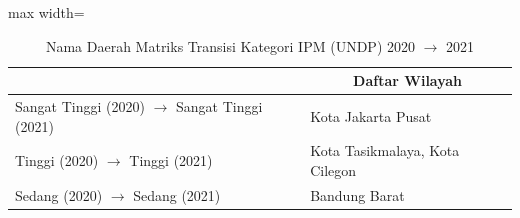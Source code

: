 \begin{table}[H]
\centering
\caption{Nama Daerah Matriks Transisi Kategori IPM (UNDP) 2020 \(\rightarrow\) 2021} \label{tab:sample2ipmname2020x2021}
\begin{adjustbox}{max width=\textwidth}
\begin{tabular}{|>{\centering\arraybackslash}p{4cm}|p{10cm}|}
\hline
\multicolumn{1}{|c|}{\textbf{Kategori}} & \multicolumn{1}{c|}{\textbf{Daftar Wilayah}} \\
\hline
Sangat Tinggi (2020) \(\rightarrow\) Sangat Tinggi (2021) & Kota Jakarta Pusat \\
\hline
Tinggi (2020) \(\rightarrow\) Tinggi (2021) & Kota Tasikmalaya, Kota Cilegon \\
\hline
Sedang (2020) \(\rightarrow\) Sedang (2021) & Bandung Barat \\
\hline
\end{tabular}
\end{adjustbox}
\end{table}